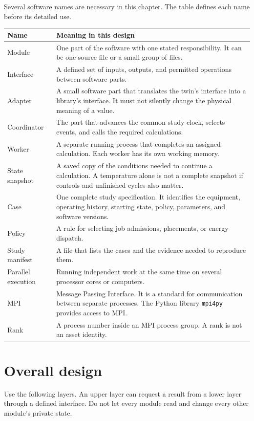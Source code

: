 \documentclass[11pt,a4paper]{report}
\begin{document}
Several software names are necessary in this chapter.
The table defines each name before its detailed use.
\begin{longtable}{L{0.19\textwidth}L{0.69\textwidth}}
\toprule Name & Meaning in this design \\ \midrule\endhead
Module & One part of the software with one stated responsibility. It can be one source file or a small group of files. \\
Interface & A defined set of inputs, outputs, and permitted operations between software parts. \\
Adapter & A small software part that translates the twin's interface into a library's interface. It must not silently change the physical meaning of a value. \\
Coordinator & The part that advances the common study clock, selects events, and calls the required calculations. \\
Worker & A separate running process that completes an assigned calculation. Each worker has its own working memory. \\
State snapshot & A saved copy of the conditions needed to continue a calculation. A temperature alone is not a complete snapshot if controls and unfinished cycles also matter. \\
Case & One complete study specification. It identifies the equipment, operating history, starting state, policy, parameters, and software versions. \\
Policy & A rule for selecting job admissions, placements, or energy dispatch. \\
Study manifest & A file that lists the cases and the evidence needed to reproduce them. \\
Parallel execution & Running independent work at the same time on several processor cores or computers. \\
MPI & Message Passing Interface. It is a standard for communication between separate processes. The Python library \texttt{mpi4py} provides access to MPI. \\
Rank & A process number inside an MPI process group. A rank is not an asset identity. \\
\bottomrule
\end{longtable}

\section{Overall design}
Use the following layers.
An upper layer can request a result from a lower layer through a defined interface.
Do not let every module read and change every other module's private state.
\end{document}
